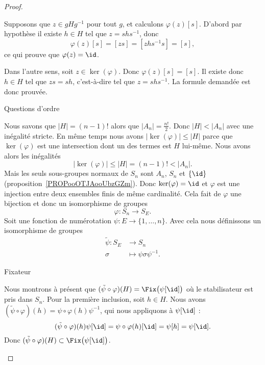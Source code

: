 \begin{proof}
\begin{subproof}
\begin{subproof}
			Supposons que \( z\in gHg^{-1}\) pour tout \( g\), et calculons \( \varphi(z)[s]\). D'abord par hypothèse il existe \( h\in H\) tel que \( z=shs^{-1}\), donc
			\begin{equation}
				\varphi(z)[s]=[zs]=[zhs^{-1}s]=[s],
			\end{equation}
			ce qui prouve que \( \varphi(z)=\id\).

			Dans l'autre sens, soit \( z\in\ker(\varphi)\). Donc \( \varphi(z)[s]=[s]\). Il existe donc \( h\in H\) tel que \( zs=sh\), c'est-à-dire tel que \( z=shs^{-1}\). La formule demandée est donc prouvée.

			\item[Questions d'ordre]

			Nous savons que \( | H |=(n-1)!\) alors que \( | A_n |=\frac{ n! }{2}\). Donc \( | H |<| A_n |\) avec une inégalité stricte. En même temps nous avons \( | \ker(\varphi) |\leq | H |\) parce que \( \ker(\varphi)\) est une intersection dont un des termes est \( H\) lui-même. Nous avons alors les inégalités
			\begin{equation}
				| \ker(\varphi) |\leq | H |=(n-1)!<| A_n |.
			\end{equation}
			Mais les seuls sous-groupes normaux de \( S_n\) sont \( A_n\), \( S_n\) et \( \{ \id \}\) (proposition~\ref{PROPooOTJAooUbzGZm}). Donc \( \ker(\varphi)=\id\) et \( \varphi\) est une injection entre deux ensembles finis de même cardinalité. Cela fait de \( \varphi\) une bijection et donc un isomorphisme de groupes
			\begin{equation}
				\varphi\colon S_n\to S_E.
			\end{equation}
			Soit une fonction de numérotation \( \psi\colon E\to \{ 1,\ldots, n \}\). Avec cela nous définissons un isomorphisme de groupes
			\begin{equation}
				\begin{aligned}
					\tilde \psi\colon S_E & \to S_n                      \\
					\sigma                & \mapsto \psi\sigma\psi^{-1}.
				\end{aligned}
			\end{equation}

			\item[Fixateur]

			Nous montrons à présent que \( (\tilde \psi\circ\varphi)(H)=\Fix\big( \psi[\id] \big)\) où le stabilisateur est pris dans \( S_n\). Pour la première inclusion, soit \( h\in H\). Nous avons \( (\tilde \psi\circ\varphi)(h)=\psi\circ\varphi(h)\psi^{-1}\), qui nous appliquons à \( \psi[\id]\) :
			\begin{equation}
				(\tilde \psi\circ\varphi)(h)\psi[\id]=\psi\circ\varphi(h)[\id]=\psi[h]=\psi[\id].
			\end{equation}
			Donc \( (\tilde \psi\circ\varphi)(H)\subset\Fix\big( \psi[\id] \big)\).


\end{subproof}
\end{subproof}
\end{proof}
